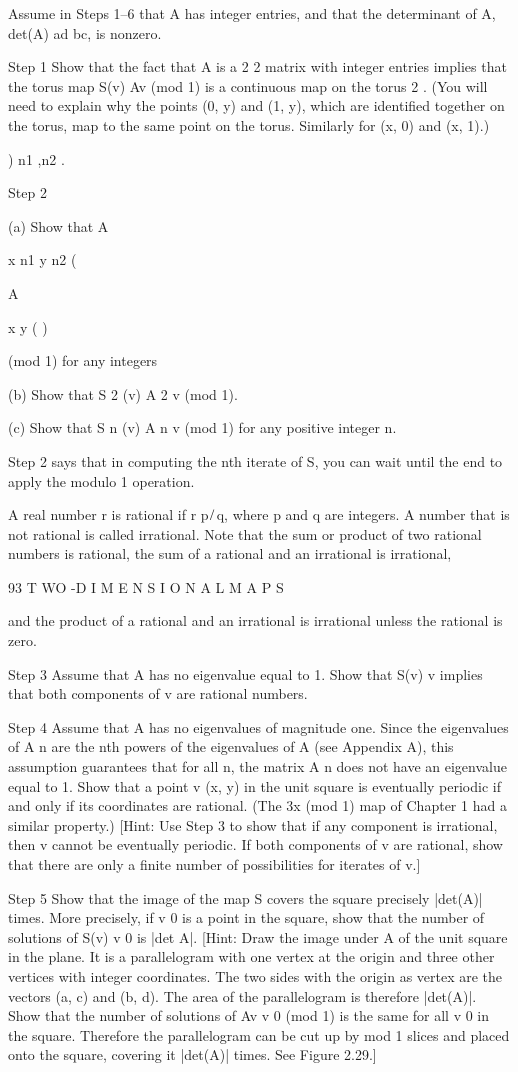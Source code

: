 \documentclass[12pt]{article}
\begin{document}
Assume in Steps 1–6 that A has integer entries, and that the determinant of A, det(A)  ad  bc, is nonzero.

Step 1 Show that the fact that A is a 2 2 matrix with integer entries implies that the torus map S(v)  Av (mod 1) is a continuous map 
on the torus  2 . (You will need to explain why the points (0, y) and (1, y), which are identiﬁed together on the torus, map to the 
same point on the torus. Similarly for (x, 0) and (x, 1).)

) n1 ,n2 .

Step 2

(a) Show that A

x  n1  y  n2  (

A

x y ( )

(mod 1) for any integers

(b) Show that S 2 (v)  A 2 v (mod 1).

(c) Show that S n (v)  A n v (mod 1) for any positive integer n.

Step 2 says that in computing the nth iterate of S, you can wait until the end to apply the modulo 1 operation.

A real number r is rational if r  p ̸ q, where p and q are integers. A number that is not rational is called irrational. Note that the 
sum or product of two rational numbers is rational, the sum of a rational and an irrational is irrational,

93 T WO -D I M E N S I O N A L M A P S

and the product of a rational and an irrational is irrational unless the rational is zero.

Step 3 Assume that A has no eigenvalue equal to 1. Show that S(v)  v implies that both components of v are rational numbers.

Step 4 Assume that A has no eigenvalues of magnitude one. Since the eigenvalues of A n are the nth powers of the eigenvalues of A 
(see Appendix A), this assumption guarantees that for all n, the matrix A n does not have an eigenvalue equal to 1. Show that a point 
v  (x, y) in the unit square is eventually periodic if and only if its coordinates are rational. (The 3x (mod 1) map of Chapter 1 had 
a similar property.) [Hint: Use Step 3 to show that if any component is irrational, then v cannot be eventually periodic. If both 
components of v are rational, show that there are only a ﬁnite number of possibilities for iterates of v.]

Step 5 Show that the image of the map S covers the square precisely |det(A)| times. More precisely, if v 0 is a point in the square, 
show that the number of solutions of S(v)  v 0 is |det A|. [Hint: Draw the image under A of the unit square in the plane. It is a 
parallelogram with one vertex at the origin and three other vertices with integer coordinates. The two sides with the origin as 
vertex are the vectors (a, c) and (b, d). The area of the parallelogram is therefore |det(A)|. Show that the number of solutions of 
Av  v 0 (mod 1) is the same for all v 0 in the square. Therefore the parallelogram can be cut up by mod 1 slices and placed onto the 
square, covering it |det(A)| times. See Figure 2.29.]
\end{document}
